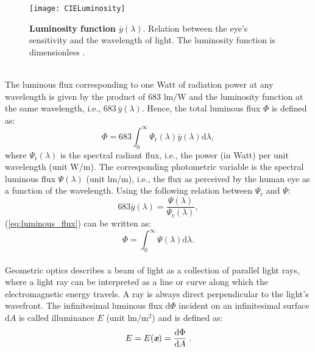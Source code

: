 \begin{figure}[t]
  \begin{center}
  \texttt{[image: CIELuminosity]}
  \end{center}
  \caption{\textbf{Luminosity function $\bar{y}(\lambda)$}. Relation between the eye's sensitivity and the wavelength of light. The luminosity function is dimensionless  \cite{wiki}.}
  \label{fig:luminosityfunction}
  \end{figure}
\\ \indent The luminous flux corresponding to one Watt of radiation power at any wavelength is given by the product of $683$ $\textrm{lm/W}$ and the luminosity function at the same wavelength,
i.e., $683 \, \bar{y}(\lambda)$. Hence, the total luminous flux $\Phi$ is defined as:
\begin{equation}\label{eq:luminous_flux}
\Phi = 683 \int_0^\infty \Psi_\textrm{r}(\lambda) \bar{y}(\lambda)\textrm{d}\lambda,
\end{equation}
where $\Psi_\textrm{r}(\lambda)$ is the spectral radiant flux, i.e., the power (in Watt) per unit wavelength (unit \textrm{W}/\textrm{m}). The corresponding photometric variable is the spectral luminous flux $\Psi(\lambda)$ (unit \textrm{lm}/\textrm{m}), i.e., the flux as perceived by the human eye as a function of the wavelength. 
Using the following relation between $\Psi_\textrm{r}$ and $\Psi$:
\begin{equation}
683 \bar{y}(\lambda) = \frac{\Psi(\lambda)}{\Psi_\textrm{r}(\lambda)}, 
\end{equation}
(\ref{eq:luminous_flux}) can be written as:
\begin{equation}
\Phi = \int_0^\infty \Psi(\lambda)\textrm{d}\lambda.
\end{equation}
\\ \indent Geometric optics describes a beam of light as a collection of parallel light rays, where a light ray can be interpreted as a line or curve along which the electromagnetic energy travels. A ray is always direct perpendicular to the light's wavefront.  
The infinitesimal luminous flux $\textrm{d}\Phi$ incident on an infinitesimal surface $\textrm{d}A$ is called illuminance $E$ (unit $\textrm{lm}/\textrm{m}^2$)
and is defined as:
\begin{equation}
 E=E(\textit{\textbf{x}}) = \frac{\textrm{d}\Phi}{\textrm{d}A}\;.
 \end{equation}
